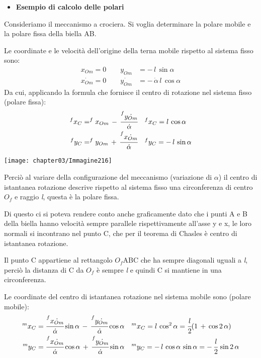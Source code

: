 \begin{itemize}
\item \textbf{Esempio di calcolo delle polari}
\end{itemize}

\begin{minipage}{.5\textwidth}
Consideriamo il meccanismo a crociera. Si voglia determinare la polare mobile e la polare fissa della biella AB.

Le coordinate e le velocità dell'origine della terna mobile rispetto al sistema fisso sono:
\begin{align*}
x_{Om}=0\qquad y_{Om}&=-\,l\,\sin{\alpha}\\
\dot{x_{Om}}=0\qquad \dot{y_{Om}}&=-\,\dot{\alpha}\,l\,\cos{\alpha}
\end{align*}
Da cui, applicando la formula che fornisce il centro di rotazione nel sistema fisso (polare fissa):
\begin{align*}
^fx_C&=^fx_{Om}\,-\,\cfrac{^f\dot{y_{Om}}}{\dot{\alpha}}&&^fx_C = l\,\cos{\alpha}\\
^fy_C&=^fy_{Om}\,+\,\cfrac{^f\dot{x_{Om}}}{\dot{\alpha}}&&^fy_C=-\,l\,\sin{\alpha}
\end{align*}
\end{minipage}
\hfill
\begin{minipage}{.5\textwidth}
\centering
\texttt{[image: chapter03/Immagine216]}
\end{minipage}
\vspace{1mm}

Perciò al variare della configurazione del meccanismo (variazione di $\alpha$) il centro di istantanea rotazione descrive rispetto al sistema fisso una circonferenza di centro $O_f$ e raggio \emph{l}, questa è la polare fissa.

Di questo ci si poteva rendere conto anche graficamente dato che i punti A e B della biella hanno velocità sempre parallele rispettivamente all'asse y e x, le loro normali si incontrano nel punto C, che per il teorema di Chasles è centro di istantanea rotazione.

Il punto C appartiene al rettangolo $O_f$ABC che ha sempre diagonali uguali a \emph{l}, perciò la distanza di C da $O_f$ è sempre \emph{l} e quindi C si mantiene in una circonferenza.

Le coordinate del centro di istantanea rotazione nel sistema mobile sono (polare mobile):
\begin{align*}
^mx_C &= \cfrac{^f\dot{x_{Om}}}{\dot{\alpha}}\sin{\alpha}\,-\,\cfrac{^f\dot{y_{Om}}}{\dot{\alpha}}\cos{\alpha}&&^mx_C=l\,\cos^2{\alpha}=\cfrac{l}{2}(1\,+\,\cos{2\,\alpha})\\
^my_C &= \cfrac{^f\dot{x_{Om}}}{\dot{\alpha}}\cos{\alpha}\,+\,\cfrac{^f\dot{y_{Om}}}{\dot{\alpha}}\sin{\alpha}&&^my_C=-\,l\,\cos{\alpha}\,\sin{\alpha}=-\,\cfrac{l}{2}\,\sin{2\,\alpha}
\end{align*}

